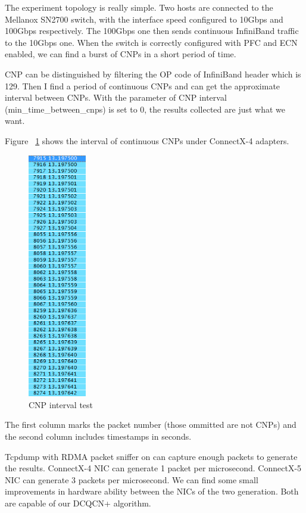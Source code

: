 \documentclass[12pt,a4paper]{article}
\begin{document}
The experiment topology is really simple.
Two hosts are connected to the Mellanox SN2700 switch, with the interface speed configured to 10Gbps and 100Gbps respectively.
The 100Gbps one then sends continuous InfiniBand traffic to the 10Gbps one.
When the switch is correctly configured with PFC and ECN enabled, we can find a burst of CNPs in a short period of time.

CNP can be distinguished by filtering the OP code of InfiniBand header which is 129.
Then I find a period of continuous CNPs and can get the approximate interval between CNPs.
With the parameter of CNP interval (min\_time\_between\_cnps) is set to 0, the results collected are just what we want.

Figure ~\ref{fig:CNPint} shows the interval of continuous CNPs under ConnectX-4 adapters.

\begin{figure}[h!]
	\begin{center}
		\includegraphics[width=1in]{CNPint}
		\caption{CNP interval test}
		\label{fig:CNPint}
	\end{center}
\end{figure}

The first column marks the packet number (those ommitted are not CNPs) and the second column includes timestamps in seconds.

Tcpdump with RDMA packet sniffer on can capture enough packets to generate the results.
ConnectX-4 NIC can generate 1 packet per microsecond.
ConnectX-5 NIC can generate 3 packets per microsecond.
We can find some small improvements in hardware ability between the NICs of the two generation.
Both are capable of our DCQCN+ algorithm.
\end{document}
